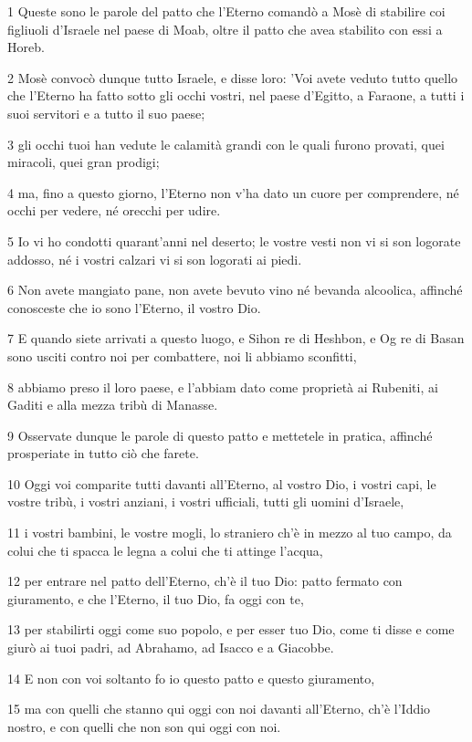 \par 1 Queste sono le parole del patto che l'Eterno comandò a Mosè di stabilire coi figliuoli d'Israele nel paese di Moab, oltre il patto che avea stabilito con essi a Horeb.
\par 2 Mosè convocò dunque tutto Israele, e disse loro: 'Voi avete veduto tutto quello che l'Eterno ha fatto sotto gli occhi vostri, nel paese d'Egitto, a Faraone, a tutti i suoi servitori e a tutto il suo paese;
\par 3 gli occhi tuoi han vedute le calamità grandi con le quali furono provati, quei miracoli, quei gran prodigi;
\par 4 ma, fino a questo giorno, l'Eterno non v'ha dato un cuore per comprendere, né occhi per vedere, né orecchi per udire.
\par 5 Io vi ho condotti quarant'anni nel deserto; le vostre vesti non vi si son logorate addosso, né i vostri calzari vi si son logorati ai piedi.
\par 6 Non avete mangiato pane, non avete bevuto vino né bevanda alcoolica, affinché conosceste che io sono l'Eterno, il vostro Dio.
\par 7 E quando siete arrivati a questo luogo, e Sihon re di Heshbon, e Og re di Basan sono usciti contro noi per combattere, noi li abbiamo sconfitti,
\par 8 abbiamo preso il loro paese, e l'abbiam dato come proprietà ai Rubeniti, ai Gaditi e alla mezza tribù di Manasse.
\par 9 Osservate dunque le parole di questo patto e mettetele in pratica, affinché prosperiate in tutto ciò che farete.
\par 10 Oggi voi comparite tutti davanti all'Eterno, al vostro Dio, i vostri capi, le vostre tribù, i vostri anziani, i vostri ufficiali, tutti gli uomini d'Israele,
\par 11 i vostri bambini, le vostre mogli, lo straniero ch'è in mezzo al tuo campo, da colui che ti spacca le legna a colui che ti attinge l'acqua,
\par 12 per entrare nel patto dell'Eterno, ch'è il tuo Dio: patto fermato con giuramento, e che l'Eterno, il tuo Dio, fa oggi con te,
\par 13 per stabilirti oggi come suo popolo, e per esser tuo Dio, come ti disse e come giurò ai tuoi padri, ad Abrahamo, ad Isacco e a Giacobbe.
\par 14 E non con voi soltanto fo io questo patto e questo giuramento,
\par 15 ma con quelli che stanno qui oggi con noi davanti all'Eterno, ch'è l'Iddio nostro, e con quelli che non son qui oggi con noi.

